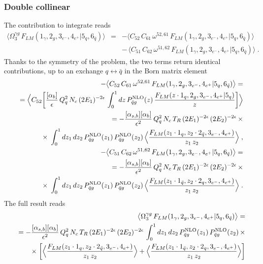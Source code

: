 \documentclass[12pt,a4paper]{article}
\newcommand{\nn}{\nonumber}
\newcommand{\eps}{\epsilon}
\newcommand{\beq}{\begin{eqnarray}}
\newcommand{\eeq}{\end{eqnarray}}
\newcommand{\barq}{{\bar{q}}}
\begin{document}
 \subsubsection{Double collinear}
 The contribution to integrate reads
 \beq
 \big\langle 
 \Omega^{\gamma g}_3
\, F_{LM}(1_\gamma,2_g,3_{e^-},4_{e^+} | 5_q, 6_{\bar{q}})
\big\rangle 
&=&
-  
\big\langle
C_{52} \, C_{61}  \, \omega^{52,61}
 \, F_{LM}(1_\gamma,2_g,3_{e^-},4_{e^+} | 5_q, 6_{\bar{q}})
\big\rangle 
\nn \\
&&
- \,  \big\langle
C_{51} \, C_{62}  \, \omega^{51,62} 
 \, F_{LM}(1_\gamma,2_g,3_{e^-},4_{e^+} | 5_q, 6_{\bar{q}})
\big\rangle \; .
\qquad
 \eeq
Thanks to the symmetry of the problem, the two terms
return identical contributions, up to an exchange
$q \leftrightarrow \barq$ in the Born matrix element
 \beq
 &&
 \hspace{-15mm}
 -  
\big\langle
C_{52} \, C_{61}  \, \omega^{52,61}
 \, F_{LM}(1_\gamma,2_g,3_{e^-},4_{e^+} | 5_q, 6_{\bar{q}})
\big\rangle 
=
\nn \\
&& =
\Big\langle
C_{52}
\bigg[
\frac{[\alpha_{b}]}{\eps}\, Q_q^2 \, N_c \, (2E_1)^{-2\eps} \, 
\int_{0}^1 dz \, 
P_{\barq g}^{\rm NLO} (z) \, 
\frac{F_{LM}(z\cdot 1_{q},2_g,3_{e^-},4_{e^+}|5_q)}{z} 
\bigg]
\Big\rangle
\nn \\
&& =
-
\frac{[\alpha_{s, b}] [\alpha_{b}]}{\eps^2}\, Q_q^2 \, N_c \, T_R \, 
(2E_1)^{-2\eps} \, 
(2E_2)^{-2\eps} \,  \times
\nn \\
&& \qquad \times \; 
\int_{0}^1 dz_1 \, dz_2 \, 
P_{\barq g}^{\rm NLO} (z_1) \, 
P_{\barq g}^{\rm NLO} (z_2) \, 
\Big\langle
\frac{F_{LM}(z_1\cdot 1_{q},z_2 \cdot 2_\barq,3_{e^-},4_{e^+})}{z_1 \, z_2} 
\Big\rangle \; ,
\nn \\
&&
 \hspace{-15mm}
-  
\big\langle
C_{51} \, C_{62}  \, \omega^{51,62}
 \, F_{LM}(1_\gamma,2_g,3_{e^-},4_{e^+} | 5_q, 6_{\bar{q}})
\big\rangle 
=
\nn \\
&& =
-
\frac{[\alpha_{s, b}] [\alpha_{b}]}{\eps^2}\, Q_q^2 \, N_c \, T_R \, 
(2E_1)^{-2\eps} \, 
(2E_2)^{-2\eps} \,  \times
\nn \\
&& \qquad \times \; 
\int_{0}^1 dz_1 \, dz_2 \, 
P_{\barq g}^{\rm NLO} (z_1) \, 
P_{\barq g}^{\rm NLO} (z_2) \, 
\Big\langle
\frac{F_{LM}(z_1\cdot 1_\barq,z_2 \cdot 2_q,3_{e^-},4_{e^+})}{z_1 \, z_2} 
\Big\rangle \; .
 \eeq
 The full result reads
 \beq
 && \hspace{-7mm} 
 \big\langle 
 \Omega^{\gamma g}_3
\, F_{LM}(1_\gamma,2_g,3_{e^-},4_{e^+} | 5_q, 6_{\bar{q}})
\big\rangle =
\nn \\
&& =
-
\frac{[\alpha_{s, b}] [\alpha_{b}]}{\eps^2}\, Q_q^2 \, N_c \, T_R \, 
(2E_1)^{-2\eps} \, 
(2E_2)^{-2\eps} \, 
\int_{0}^1 dz_1 \, dz_2 \, 
P_{\barq g}^{\rm NLO} (z_1) \, 
P_{\barq g}^{\rm NLO} (z_2) \, 
 \times
\nn \\
&& \qquad \times \; 
\bigg[
\Big\langle
\frac{F_{LM}(z_1\cdot 1_q,z_2 \cdot 2_\barq,3_{e^-},4_{e^+})}{z_1 \, z_2} 
\Big\rangle
+
\Big\langle
\frac{F_{LM}(z_1\cdot 1_\barq,z_2 \cdot 2_q,3_{e^-},4_{e^+})}{z_1 \, z_2} 
\Big\rangle
\bigg]
 \eeq
\end{document}
